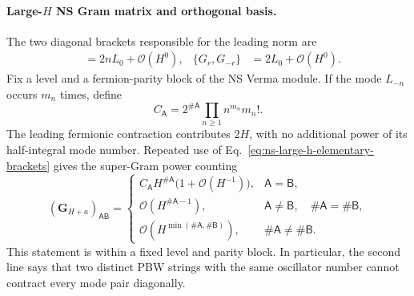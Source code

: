 \documentclass[11pt]{article}
\newcommand{\order}{\mathcal O}
\begin{document}
\paragraph{Large-\(H\) NS Gram matrix and orthogonal basis.}
The two diagonal brackets responsible for the leading norm are
\begin{align}
 [L_n,L_{-n}]&=2nL_0+\order(H^0),
 &
 \{G_r,G_{-r}\}&=2L_0+\order(H^0).
 \label{eq:ns-large-h-elementary-brackets}
\end{align}
Fix a level and a fermion-parity block of the NS Verma module.  If the mode
\(L_{-n}\) occurs \(m_n\) times, define
\begin{equation}
 C_{\mathsf A}
 =
 2^{\#\mathsf A}
 \prod_{n\geq1}n^{m_n}m_n! .
 \label{eq:ns-large-h-leading-norm-constant}
\end{equation}
The leading fermionic contraction contributes \(2H\), with no additional
power of its half-integral mode number.  Repeated use of
Eq.~\eqref{eq:ns-large-h-elementary-brackets} gives the super-Gram power
counting
\begin{equation}
 (\mathbf G_{H+a})_{\mathsf A\mathsf B}
 =
 \begin{cases}
 C_{\mathsf A}H^{\#\mathsf A}
 \bigl(1+\order(H^{-1})\bigr),
 &\mathsf A=\mathsf B,\\[2pt]
 \order(H^{\#\mathsf A-1}),
 &\mathsf A\neq\mathsf B,\quad
   \#\mathsf A=\#\mathsf B,\\[2pt]
 \order\!\left(H^{\min(\#\mathsf A,\#\mathsf B)}\right),
 &\#\mathsf A\neq\#\mathsf B .
 \end{cases}
 \label{eq:ns-large-h-gram-power-counting}
\end{equation}
This statement is within a fixed level and parity block.  In particular,
the second line says that two distinct PBW strings with the same oscillator
number cannot contract every mode pair diagonally.
\end{document}
